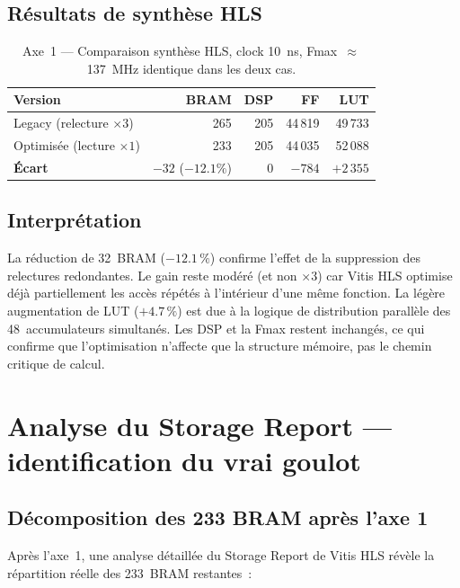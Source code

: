 \documentclass[11pt,a4paper]{article}
\begin{document}
\subsection{Résultats de synthèse HLS}

\begin{table}[H]
\centering
\renewcommand{\arraystretch}{1.3}
\begin{tabular}{lrrrr}
\toprule
\textbf{Version} & \textbf{BRAM} & \textbf{DSP} & \textbf{FF} & \textbf{LUT} \\
\midrule
Legacy (relecture $\times3$)    & 265 & 205 & 44\,819 & 49\,733 \\
Optimisée (lecture $\times1$)   & 233 & 205 & 44\,035 & 52\,088 \\
\midrule
\textbf{Écart} & $-32$ ($-12.1\%$) & $0$ & $-784$ & $+2\,355$ \\
\bottomrule
\end{tabular}
\caption{Axe~1 --- Comparaison synth\`ese HLS, clock 10~ns, Fmax~$\approx$137~MHz identique dans les deux cas.}
\end{table}

\subsection{Interprétation}

La réduction de 32~BRAM ($-12.1\,\%$) confirme l'effet de la suppression des relectures redondantes. Le gain reste modéré (et non $\times3$) car Vitis HLS optimise déjà partiellement les accès répétés à l'intérieur d'une même fonction. La légère augmentation de LUT ($+4.7\,\%$) est due à la logique de distribution parallèle des 48~accumulateurs simultanés. Les DSP et la Fmax restent inchangés, ce qui confirme que l'optimisation n'affecte que la structure mémoire, pas le chemin critique de calcul.

\section{Analyse du Storage Report --- identification du vrai goulot}
\label{sec:storage-report}

\subsection{Décomposition des 233 BRAM après l'axe 1}

Après l'axe~1, une analyse détaillée du Storage Report de Vitis HLS révèle la répartition réelle des 233~BRAM restantes~:
\end{document}
